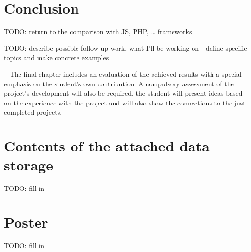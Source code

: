 \documentclass[english,odsaz]{fitthesis}
\begin{document}
\chapter{Conclusion}
\label{sec:org98533c2}
TODO: return to the comparison with JS, PHP, \ldots{} frameworks

TODO: describe possible follow-up work, what I'll be working on - define
  specific topics and make concrete examples

-- The final chapter includes an evaluation of the achieved results with a special
emphasis on the student's own contribution. A compulsory assessment of the
project's development will also be required, the student will present ideas
based on the experience with the project and will also show the connections to
the just completed projects. \cite{Pravidla}

\makeatletter
\def\@openbib@code{\addcontentsline{toc}{chapter}{Bibliography}}
\makeatother


\begin{flushleft}

\end{flushleft}
\iftwoside\cleardoublepage\fi

\appendix
\appendixpage
\iftwoside\cleardoublepage\fi

\startcontents[chapters]
\iftwoside\cleardoublepage\fi

\chapter{Contents of the attached data storage}
\label{sec:org77a91be}
TODO: fill in

\chapter{Poster}
\label{sec:org4653727}
TODO: fill in
\end{document}
